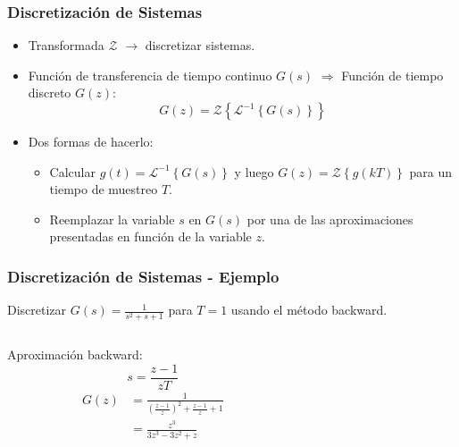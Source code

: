\documentclass[aspectratio=169]{beamer}
\theoremstyle{definition}
\theoremstyle{plain}
\theoremstyle{remark}
\begin{document}
\begin{frame}[<+->]\frametitle{Discretización de Sistemas}
	\begin{itemize}
		\item Transformada $\mathcal{Z}$ $\rightarrow$ discretizar sistemas.
		\item Función de transferencia de tiempo continuo $G(s)$ $\Longrightarrow$ Función de tiempo discreto $G(z)$:
		\begin{equation*}
			G(z) = \mathcal{Z}\left\{ \mathcal{L}^{-1}\left\{ G(s)\right\} \right\}
		\end{equation*}
		\item Dos formas de hacerlo:
		\begin{itemize}
			\item Calcular $g(t) = \mathcal{L}^{-1}\left\{ G(s)\right\}$ y luego $G(z) = \mathcal{Z}\left\{ g(kT) \right\}$ para un tiempo de muestreo $T$.
			\item Reemplazar la variable $s$ en $G(s)$ por una de las aproximaciones presentadas en función de la variable $z$.
		\end{itemize} 
	\end{itemize}
\end{frame}

\begin{frame}[c]\frametitle{Discretización de Sistemas - Ejemplo}
	\vspace*{3mm}	
	Discretizar $G(s) = \frac{1}{s^2 + s + 1}$ para $T=1$ usando el método backward.\\
	\pause
	\vspace*{4mm}
	\begin{columns}
		\begin{column}{0.3\textwidth}
			Aproximación backward:
			\begin{equation*}
				s = \frac{z-1}{zT}
			\end{equation*}
			\pause
			\begin{align*}
				G(z) &= \frac{1}{\left(\frac{z-1}{z}\right)^2 + \frac{z-1}{z} + 1}\\
				&= \frac{z^3}{3z^3-3z^2+z}
			\end{align*}
		\end{column}
		\pause
		\begin{column}{0.7\textwidth}
			
		\end{column}
	\end{columns}
\end{frame}
\end{document}
